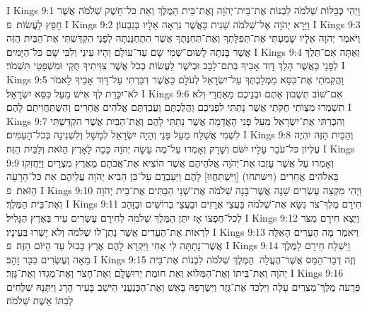 I Kings 9:1	וַיְהִי כְּכַלּוֹת שְׁלֹמֹה לִבְנוֹת אֶת־בֵּית־יְהֹוָה וְאֶת־בֵּית הַמֶּלֶךְ וְאֵת כּל־חֵשֶׁק שְׁלֹמֹה אֲשֶׁר חָפֵץ לַעֲשׂוֹת׃ {פ}
I Kings 9:2	וַיֵּרָא יְהֹוָה אֶל־שְׁלֹמֹה שֵׁנִית כַּאֲשֶׁר נִרְאָה אֵלָיו בְּגִבְעוֹן׃
I Kings 9:3	וַיֹּאמֶר יְהֹוָה אֵלָיו שָׁמַעְתִּי אֶת־תְּפִלָּתְךָ וְאֶת־תְּחִנָּתְךָ אֲשֶׁר הִתְחַנַּנְתָּה לְפָנַי הִקְדַּשְׁתִּי אֶת־הַבַּיִת הַזֶּה אֲשֶׁר בָּנִתָה לָשׂוּם־שְׁמִי שָׁם עַד־עוֹלָם וְהָיוּ עֵינַי וְלִבִּי שָׁם כּל־הַיָּמִים׃
I Kings 9:4	וְאַתָּה אִם־תֵּלֵךְ לְפָנַי כַּאֲשֶׁר הָלַךְ דָּוִד אָבִיךָ בְּתם־לֵבָב וּבְיֹשֶׁר לַעֲשׂוֹת כְּכֹל אֲשֶׁר צִוִּיתִיךָ חֻקַּי וּמִשְׁפָּטַי תִּשְׁמֹר׃
I Kings 9:5	וַהֲקִמֹתִי אֶת־כִּסֵּא מַמְלַכְתְּךָ עַל־יִשְׂרָאֵל לְעֹלָם כַּאֲשֶׁר דִּבַּרְתִּי עַל־דָּוִד אָבִיךָ לֵאמֹר לֹא־יִכָּרֵת לְךָ אִישׁ מֵעַל כִּסֵּא יִשְׂרָאֵל׃
I Kings 9:6	אִם־שׁוֹב תְּשֻׁבוּן אַתֶּם וּבְנֵיכֶם מֵאַחֲרַי וְלֹא תִשְׁמְרוּ מִצְוֺתַי חֻקֹּתַי אֲשֶׁר נָתַתִּי לִפְנֵיכֶם וַהֲלַכְתֶּם וַעֲבַדְתֶּם אֱלֹהִים אֲחֵרִים וְהִשְׁתַּחֲוִיתֶם לָהֶם׃
I Kings 9:7	וְהִכְרַתִּי אֶת־יִשְׂרָאֵל מֵעַל פְּנֵי הָאֲדָמָה אֲשֶׁר נָתַתִּי לָהֶם וְאֶת־הַבַּיִת אֲשֶׁר הִקְדַּשְׁתִּי לִשְׁמִי אֲשַׁלַּח מֵעַל פָּנָי וְהָיָה יִשְׂרָאֵל לְמָשָׁל וְלִשְׁנִינָה בְּכל־הָעַמִּים׃
I Kings 9:8	וְהַבַּיִת הַזֶּה יִהְיֶה עֶלְיוֹן כּל־עֹבֵר עָלָיו יִשֹּׁם וְשָׁרָק וְאָמְרוּ עַל־מֶה עָשָׂה יְהֹוָה כָּכָה לָאָרֶץ הַזֹּאת וְלַבַּיִת הַזֶּה׃
I Kings 9:9	וְאָמְרוּ עַל אֲשֶׁר עָזְבוּ אֶת־יְהֹוָה אֱלֹהֵיהֶם אֲשֶׁר הוֹצִיא אֶת־אֲבֹתָם מֵאֶרֶץ מִצְרַיִם וַיַּחֲזִקוּ בֵּאלֹהִים אֲחֵרִים (וישתחו) [וַיִּשְׁתַּחֲווּ] לָהֶם וַיַּעַבְדֻם עַל־כֵּן הֵבִיא יְהֹוָה עֲלֵיהֶם אֵת כּל־הָרָעָה הַזֹּאת׃ {פ}
I Kings 9:10	וַיְהִי מִקְצֵה עֶשְׂרִים שָׁנָה אֲשֶׁר־בָּנָה שְׁלֹמֹה אֶת־שְׁנֵי הַבָּתִּים אֶת־בֵּית יְהֹוָה וְאֶת־בֵּית הַמֶּלֶךְ׃
I Kings 9:11	חִירָם מֶלֶךְ־צֹר נִשָּׂא אֶת־שְׁלֹמֹה בַּעֲצֵי אֲרָזִים וּבַעֲצֵי בְרוֹשִׁים וּבַזָּהָב לְכל־חֶפְצוֹ אָז יִתֵּן הַמֶּלֶךְ שְׁלֹמֹה לְחִירָם עֶשְׂרִים עִיר בְּאֶרֶץ הַגָּלִיל׃
I Kings 9:12	וַיֵּצֵא חִירָם מִצֹּר לִרְאוֹת אֶת־הֶעָרִים אֲשֶׁר נָתַן־לוֹ שְׁלֹמֹה וְלֹא יָשְׁרוּ בְּעֵינָיו׃
I Kings 9:13	וַיֹּאמֶר מָה הֶעָרִים הָאֵלֶּה אֲשֶׁר־נָתַתָּה לִּי אָחִי וַיִּקְרָא לָהֶם אֶרֶץ כָּבוּל עַד הַיּוֹם הַזֶּה׃ {פ}
I Kings 9:14	וַיִּשְׁלַח חִירָם לַמֶּלֶךְ מֵאָה וְעֶשְׂרִים כִּכַּר זָהָב׃
I Kings 9:15	וְזֶה דְבַר־הַמַּס אֲשֶׁר־הֶעֱלָה  הַמֶּלֶךְ שְׁלֹמֹה לִבְנוֹת אֶת־בֵּית יְהֹוָה וְאֶת־בֵּיתוֹ וְאֶת־הַמִּלּוֹא וְאֵת חוֹמַת יְרוּשָׁלָ͏ִם וְאֶת־חָצֹר וְאֶת־מְגִדּוֹ וְאֶת־גָּזֶר׃
I Kings 9:16	פַּרְעֹה מֶלֶךְ־מִצְרַיִם עָלָה וַיִּלְכֹּד אֶת־גֶּזֶר וַיִּשְׂרְפָהּ בָּאֵשׁ וְאֶת־הַכְּנַעֲנִי הַיֹּשֵׁב בָּעִיר הָרָג וַיִּתְּנָהּ שִׁלֻּחִים לְבִתּוֹ אֵשֶׁת שְׁלֹמֹה׃
